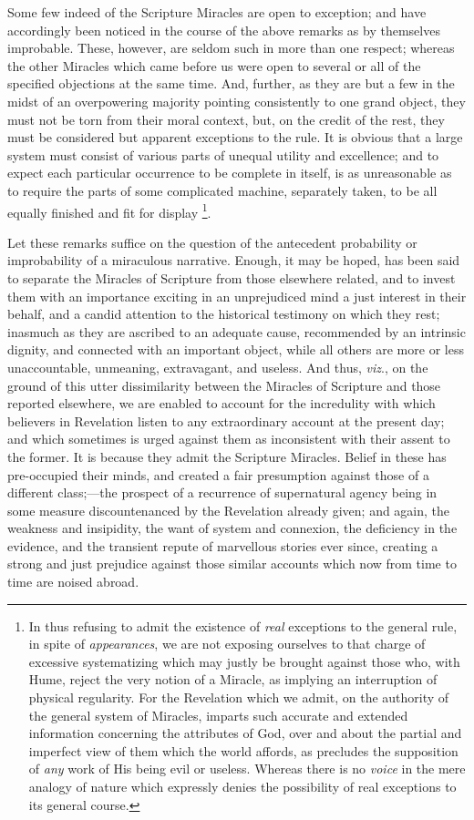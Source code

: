 Some few indeed of the Scripture Miracles are
open to exception; and have accordingly been noticed in the course of the above remarks as by themselves improbable. These,
however, are seldom such in more than one respect; whereas the other
Miracles which came before us were open to several or all of the
specified objections at the same time. And, further, as they are but a
few in the midst of an overpowering majority pointing consistently to
one grand object, they must not be torn from their moral context, but,
on the credit of the rest, they must be considered but apparent
exceptions to the rule. It is obvious that a large system must consist
of various parts of unequal utility and excellence; and to expect each
particular occurrence to be complete in itself, is as unreasonable as
to require the parts of some complicated machine, separately taken, to
be all equally finished and fit for display \footnote{In thus refusing to admit the existence of \emph{real}
exceptions to the general rule, in spite of \emph{appearances}, we are
not exposing ourselves to that charge of excessive systematizing which
may justly be brought against those who, with Hume, reject the very
notion of a Miracle, as implying an interruption of physical
regularity. For the Revelation which we admit, on the authority of the
general system of Miracles, imparts such accurate and extended
information concerning the attributes of God, over and about the
partial and imperfect view of them which the world affords, as
precludes the supposition of \emph{any} work of His being evil or
useless. Whereas there is no \emph{voice} in the mere analogy of
nature which expressly denies the possibility of real exceptions to
its general course.}.

Let these remarks suffice on the question of the
antecedent probability or improbability of a miraculous narrative. Enough, it may be hoped, has been said to separate the
Miracles of Scripture from those elsewhere related, and to invest them
with an importance exciting in an unprejudiced mind a just interest in
their behalf, and a candid attention to the historical testimony on
which they rest; inasmuch as they are ascribed to an adequate cause,
recommended by an intrinsic dignity, and connected with an important
object, while all others are more or less unaccountable, unmeaning,
extravagant, and useless. And thus, \emph{viz}., on the ground of this utter
dissimilarity between the Miracles of Scripture and those reported
elsewhere, we are enabled to account for the incredulity with which
believers in Revelation listen to any extraordinary account at the
present day; and which sometimes is urged against them as inconsistent
with their assent to the former. It is because they admit the
Scripture Miracles. Belief in these has pre-occupied their minds, and
created a fair presumption against those of a different class;—the
prospect of a recurrence of supernatural agency being in some measure
discountenanced by the Revelation already given; and again, the
weakness and insipidity, the want of system and connexion, the
deficiency in the evidence, and the transient repute of marvellous
stories ever since, creating a strong and just prejudice against those
similar accounts which now from time to time are noised abroad.

